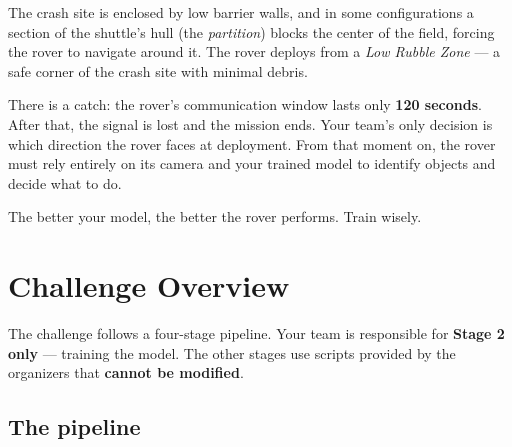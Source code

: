 \documentclass[a4]{article}
\begin{document}
The crash site is enclosed by low barrier walls, and in some configurations a section of the shuttle's hull (the \textit{partition}) blocks the center of the field, forcing the rover to navigate around it. The rover deploys from a \textit{Low Rubble Zone} --- a safe corner of the crash site with minimal debris.

There is a catch: the rover's communication window lasts only \textbf{120 seconds}. After that, the signal is lost and the mission ends. Your team's only decision is which direction the rover faces at deployment. From that moment on, the rover must rely entirely on its camera and your trained model to identify objects and decide what to do.

The better your model, the better the rover performs. Train wisely.

\pagebreak
\section*{Challenge Overview}

The challenge follows a four-stage pipeline. Your team is responsible for \textbf{Stage 2 only} --- training the model. The other stages use scripts provided by the organizers that \textbf{cannot be modified}.

\subsection*{The pipeline}
\end{document}
